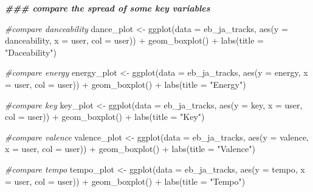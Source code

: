 \documentclass[
]{article}
\newenvironment{Shaded}{\begin{snugshade}}{\end{snugshade}}
\newcommand{\AttributeTok}[1]{\textcolor[rgb]{0.77,0.63,0.00}{#1}}
\newcommand{\CommentTok}[1]{\textcolor[rgb]{0.56,0.35,0.01}{\textit{#1}}}
\newcommand{\DocumentationTok}[1]{\textcolor[rgb]{0.56,0.35,0.01}{\textbf{\textit{#1}}}}
\newcommand{\FunctionTok}[1]{\textcolor[rgb]{0.00,0.00,0.00}{#1}}
\newcommand{\NormalTok}[1]{#1}
\newcommand{\OtherTok}[1]{\textcolor[rgb]{0.56,0.35,0.01}{#1}}
\newcommand{\SpecialCharTok}[1]{\textcolor[rgb]{0.00,0.00,0.00}{#1}}
\newcommand{\StringTok}[1]{\textcolor[rgb]{0.31,0.60,0.02}{#1}}
\begin{document}
\begin{Shaded}
\begin{Highlighting}[]
\DocumentationTok{\#\#\# compare the spread of some key variables }

\CommentTok{\#compare danceability}
\NormalTok{dance\_plot }\OtherTok{\textless{}{-}} \FunctionTok{ggplot}\NormalTok{(}\AttributeTok{data =}\NormalTok{ eb\_ja\_tracks,}
       \FunctionTok{aes}\NormalTok{(}\AttributeTok{y =}\NormalTok{ danceability,}
           \AttributeTok{x =}\NormalTok{ user,}
           \AttributeTok{col =}\NormalTok{ user)) }\SpecialCharTok{+}
  \FunctionTok{geom\_boxplot}\NormalTok{() }\SpecialCharTok{+}
  \FunctionTok{labs}\NormalTok{(}\AttributeTok{title =} \StringTok{"Daceability"}\NormalTok{)}

\CommentTok{\#compare energy}
\NormalTok{energy\_plot }\OtherTok{\textless{}{-}} \FunctionTok{ggplot}\NormalTok{(}\AttributeTok{data =}\NormalTok{ eb\_ja\_tracks,}
       \FunctionTok{aes}\NormalTok{(}\AttributeTok{y =}\NormalTok{ energy,}
           \AttributeTok{x =}\NormalTok{ user,}
           \AttributeTok{col =}\NormalTok{ user)) }\SpecialCharTok{+}
  \FunctionTok{geom\_boxplot}\NormalTok{() }\SpecialCharTok{+}
  \FunctionTok{labs}\NormalTok{(}\AttributeTok{title =} \StringTok{"Energy"}\NormalTok{)}

\CommentTok{\#compare key}
\NormalTok{key\_plot }\OtherTok{\textless{}{-}} \FunctionTok{ggplot}\NormalTok{(}\AttributeTok{data =}\NormalTok{ eb\_ja\_tracks,}
       \FunctionTok{aes}\NormalTok{(}\AttributeTok{y =}\NormalTok{ key,}
           \AttributeTok{x =}\NormalTok{ user,}
           \AttributeTok{col =}\NormalTok{ user)) }\SpecialCharTok{+}
  \FunctionTok{geom\_boxplot}\NormalTok{() }\SpecialCharTok{+}
  \FunctionTok{labs}\NormalTok{(}\AttributeTok{title =} \StringTok{"Key"}\NormalTok{)}

\CommentTok{\#compare valence}
\NormalTok{valence\_plot }\OtherTok{\textless{}{-}} \FunctionTok{ggplot}\NormalTok{(}\AttributeTok{data =}\NormalTok{ eb\_ja\_tracks,}
       \FunctionTok{aes}\NormalTok{(}\AttributeTok{y =}\NormalTok{ valence,}
           \AttributeTok{x =}\NormalTok{ user,}
           \AttributeTok{col =}\NormalTok{ user)) }\SpecialCharTok{+}
  \FunctionTok{geom\_boxplot}\NormalTok{() }\SpecialCharTok{+}
  \FunctionTok{labs}\NormalTok{(}\AttributeTok{title =} \StringTok{"Valence"}\NormalTok{)}

\CommentTok{\#compare tempo}
\NormalTok{tempo\_plot }\OtherTok{\textless{}{-}} \FunctionTok{ggplot}\NormalTok{(}\AttributeTok{data =}\NormalTok{ eb\_ja\_tracks,}
       \FunctionTok{aes}\NormalTok{(}\AttributeTok{y =}\NormalTok{ tempo,}
           \AttributeTok{x =}\NormalTok{ user,}
           \AttributeTok{col =}\NormalTok{ user)) }\SpecialCharTok{+}
  \FunctionTok{geom\_boxplot}\NormalTok{() }\SpecialCharTok{+}
  \FunctionTok{labs}\NormalTok{(}\AttributeTok{title =} \StringTok{"Tempo"}\NormalTok{)}


\end{Highlighting}
\end{Shaded}
\end{document}
